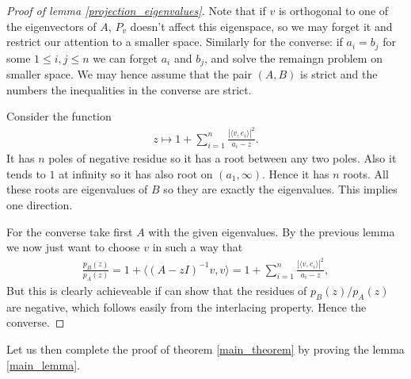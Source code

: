 \begin{proof}[Proof of lemma \ref{projection_eigenvalues}]
	Note that if $v$ is orthogonal to one of the eigenvectors of $A$, $P_{v}$ doesn't affect this eigenspace, so we may forget it and restrict our attention to a smaller space. Similarly for the converse: if $a_{i} = b_{j}$ for some $1 \leq i, j \leq n$ we can forget $a_{i}$ and $b_{j}$, and solve the remaingn problem on smaller space. We may hence assume that the pair $(A, B)$ is strict and the numbers the inequalities in the converse are strict.

	Consider the function
	\begin{align*}
		z \mapsto 1 + \sum_{i = 1}^{n} \frac{|\langle v, e_{i} \rangle|^2}{a_{i} - z}.
	\end{align*}
	It has $n$ poles of negative residue so it has a root between any two poles. Also it tends to $1$ at infinity so it has also root on $(a_{1}, \infty)$. Hence it has $n$ roots. All these roots are eigenvalues of $B$ so they are exactly the eigenvalues. This implies one direction.

	For the converse take first $A$ with the given eigenvalues. By the previous lemma we now just want to choose $v$ in such a way that
	\begin{align*}
		\frac{p_{B}(z)}{p_{A}(z)} = 1 + \langle (A - z I)^{-1}v, v\rangle= 1 + \sum_{i = 1}^{n} \frac{|\langle v, e_{i} \rangle|^2}{a_{i} - z},
	\end{align*}
	But this is clearly achieveable if can show that the residues of $p_{B}(z)/p_{A}(z)$ are negative, which follows easily from the interlacing property. Hence the converse.
\end{proof}

Let us then complete the proof of theorem \ref{main_theorem} by proving the lemma \ref{main_lemma}.

